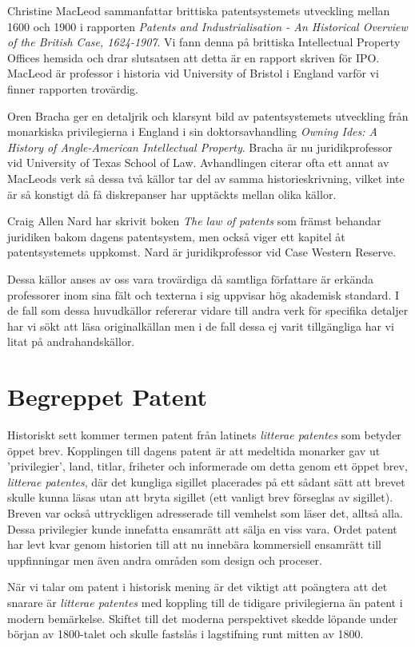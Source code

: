 Christine MacLeod sammanfattar brittiska patentsystemets utveckling mellan 
1600 och 1900 i rapporten \emph{Patents and Industrialisation - An Historical 
Overview of the British Case, 1624-1907}. Vi fann denna på brittiska 
Intellectual Property Offices hemsida och drar slutsatsen att detta är en 
rapport skriven för IPO. MacLeod är professor i historia vid University of 
Bristol i England varför vi finner rapporten trovärdig.

Oren Bracha ger en detaljrik och klarsynt bild av patentsystemets utveckling 
från monarkiska privilegierna i England i sin doktorsavhandling \emph{Owning 
Ides: A History of Angle-American Intellectual Property}. Bracha är nu 
juridikprofessor vid University of Texas School of Law. Avhandlingen citerar 
ofta ett annat av MacLeods verk så dessa två källor tar del av samma 
historieskrivning, vilket inte är så konstigt då få diskrepanser har upptäckts 
mellan olika källor.

Craig Allen Nard har skrivit boken \emph{The law of patents} som främst 
behandar juridiken bakom dagens patentsystem, men också viger ett kapitel åt 
patentsystemets uppkomst. Nard är juridikprofessor vid Case Western Reserve.

Dessa källor anses av oss vara trovärdiga då samtliga författare är erkända 
professorer inom sina fält och texterna i sig uppvisar hög akademisk standard. 
I de fall som dessa huvudkällor refererar vidare till andra verk för 
specifika detaljer har vi sökt att läsa originalkällan men i de fall dessa ej 
varit tillgängliga har vi litat på andrahandskällor.







\section{Begreppet Patent} %
\label{sec:lit}

Historiskt sett kommer termen patent från latinets \emph{litterae patentes} som
betyder öppet brev. Kopplingen till dagens patent är att medeltida monarker gav
ut 'privilegier', land, titlar, friheter och informerade om detta genom ett
öppet brev, \emph{litterae patentes}, där det kungliga sigillet placerades på
ett sådant sätt att brevet skulle kunna läsas utan att bryta sigillet\cite{blackstone} (ett vanligt brev förseglas av sigillet). Breven var också uttryckligen adresserade till 
vemhelst som läser det, alltså alla. Dessa privilegier kunde innefatta ensamrätt
att sälja en viss vara. Ordet patent har levt kvar genom historien till 
att nu innebära kommersiell ensamrätt till uppfinningar men även andra områden som design och proceser. 

När vi talar om patent i historisk mening är det viktigt att poängtera att det 
snarare är \emph{litterae patentes} med koppling till de tidigare 
privilegierna än patent i modern bemärkelse. Skiftet till det moderna perspektivet skedde löpande under början av 1800-talet och skulle fastslås i lagstifning runt mitten av 1800.
